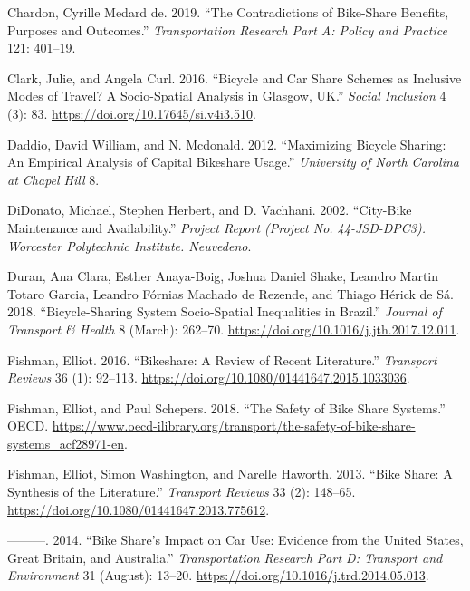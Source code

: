 \documentclass[
]{article}
\newlength{\cslhangindent}
\newenvironment{cslreferences}%
  {\setlength{\parindent}{0pt}%
  \everypar{\setlength{\hangindent}{\cslhangindent}}\ignorespaces}%
  {\par}
\begin{document}
\begin{cslreferences}
\leavevmode\hypertarget{ref-de_chardon_contradictions_2019}{}%
Chardon, Cyrille Medard de. 2019. ``The Contradictions of Bike-Share Benefits, Purposes and Outcomes.'' \emph{Transportation Research Part A: Policy and Practice} 121: 401--19.

\leavevmode\hypertarget{ref-clark_bicycle_2016}{}%
Clark, Julie, and Angela Curl. 2016. ``Bicycle and Car Share Schemes as Inclusive Modes of Travel? A Socio-Spatial Analysis in Glasgow, UK.'' \emph{Social Inclusion} 4 (3): 83. \url{https://doi.org/10.17645/si.v4i3.510}.

\leavevmode\hypertarget{ref-daddio_maximizing_2012}{}%
Daddio, David William, and N. Mcdonald. 2012. ``Maximizing Bicycle Sharing: An Empirical Analysis of Capital Bikeshare Usage.'' \emph{University of North Carolina at Chapel Hill} 8.

\leavevmode\hypertarget{ref-didonato_city-bike_2002}{}%
DiDonato, Michael, Stephen Herbert, and D. Vachhani. 2002. ``City-Bike Maintenance and Availability.'' \emph{Project Report (Project No. 44-JSD-DPC3). Worcester Polytechnic Institute. Neuvedeno}.

\leavevmode\hypertarget{ref-duran_bicycle-sharing_2018}{}%
Duran, Ana Clara, Esther Anaya-Boig, Joshua Daniel Shake, Leandro Martin Totaro Garcia, Leandro Fórnias Machado de Rezende, and Thiago Hérick de Sá. 2018. ``Bicycle-Sharing System Socio-Spatial Inequalities in Brazil.'' \emph{Journal of Transport \& Health} 8 (March): 262--70. \url{https://doi.org/10.1016/j.jth.2017.12.011}.

\leavevmode\hypertarget{ref-fishman_bikeshare:_2016}{}%
Fishman, Elliot. 2016. ``Bikeshare: A Review of Recent Literature.'' \emph{Transport Reviews} 36 (1): 92--113. \url{https://doi.org/10.1080/01441647.2015.1033036}.

\leavevmode\hypertarget{ref-fishman_safety_2018}{}%
Fishman, Elliot, and Paul Schepers. 2018. ``The Safety of Bike Share Systems.'' OECD. \url{https://www.oecd-ilibrary.org/transport/the-safety-of-bike-share-systems_acf28971-en}.

\leavevmode\hypertarget{ref-fishman_bike_2013}{}%
Fishman, Elliot, Simon Washington, and Narelle Haworth. 2013. ``Bike Share: A Synthesis of the Literature.'' \emph{Transport Reviews} 33 (2): 148--65. \url{https://doi.org/10.1080/01441647.2013.775612}.

\leavevmode\hypertarget{ref-fishman_bike_2014}{}%
---------. 2014. ``Bike Share's Impact on Car Use: Evidence from the United States, Great Britain, and Australia.'' \emph{Transportation Research Part D: Transport and Environment} 31 (August): 13--20. \url{https://doi.org/10.1016/j.trd.2014.05.013}.


\end{cslreferences}
\end{document}
